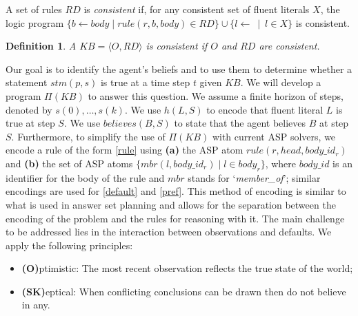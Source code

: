 \documentclass{article}
\newtheorem{definition}{Definition}
\begin{document}
A set of rules $RD$ is \emph{consistent} if, for any consistent set of fluent literals $X$, the logic program 
$\{b \leftarrow body  \mid rule(r, b, body) \in RD\} \cup \{l \leftarrow \:\mid\: l\in X\}$
is consistent.
%
\begin{definition}
A $KB = \langle O, RD \rangle$ is \emph{consistent} if $O$ and $RD$ are consistent. 
\end{definition} 
%
Our goal is to identify the agent's beliefs and to use them to determine whether  a statement $stm(p, s)$ is true at a time step $t$ given $KB$. We will develop a program $\Pi(KB)$ to answer this question. We assume a finite horizon of steps, denoted by $s(0), \ldots, s(k)$. We use $h(L,S)$ to encode that fluent literal $L$ is true at step $S$. We use $believes(B,S)$ to state that the agent believes $B$ at step $S$. Furthermore, to simplify the use of $\Pi(KB)$ with current ASP solvers, we  encode a rule of the form \eqref{rule}  using {\bf (a)} the ASP atom $rule(r, head, body\_id_{r})$ and
{\bf (b)} the set of ASP atoms $\{mbr(l, body\_id_r) \mid l \in body_{r}\}$, where $body\_id$ is an identifier for the body of the rule and $mbr$ stands for `\textit{member\_of}'; similar encodings are used for  \eqref{default} and \eqref{pref}. 
This method of encoding is similar to what is used  in answer set planning and allows for the separation between  the encoding of the problem and the rules for reasoning with it.
The main challenge to be addressed lies in the interaction between observations and defaults. 
We apply the following principles:
%
\begin{itemize}
\item[]{\bf (O)}ptimistic: The most recent observation reflects the true state of the world;
\item[]{\bf (SK)}eptical: When conflicting conclusions can be drawn then do not believe in any.
\end{itemize}  

\end{document}
